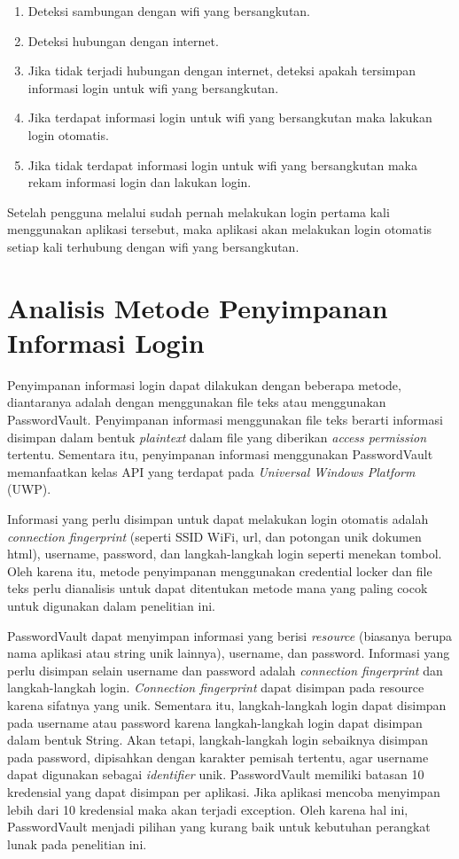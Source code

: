 \begin{enumerate}
    \item{Deteksi sambungan dengan wifi yang bersangkutan.}
    \item{Deteksi hubungan dengan internet.}
    \item{Jika tidak terjadi hubungan dengan internet, deteksi apakah tersimpan informasi login untuk wifi yang bersangkutan.}
    \item{Jika terdapat informasi login untuk wifi yang bersangkutan maka lakukan login otomatis.}
    \item{Jika tidak terdapat informasi login untuk wifi yang bersangkutan maka rekam informasi login dan lakukan login.}
\end{enumerate}

Setelah pengguna melalui sudah pernah melakukan login pertama kali menggunakan aplikasi tersebut, maka aplikasi akan melakukan login otomatis setiap kali terhubung dengan wifi yang bersangkutan.



\section{Analisis Metode Penyimpanan Informasi Login}
\label{sec:metode_penyimpanan}

Penyimpanan informasi login dapat dilakukan dengan beberapa metode, diantaranya adalah dengan menggunakan file teks atau menggunakan PasswordVault. Penyimpanan informasi menggunakan file teks berarti informasi disimpan dalam bentuk \textit{plaintext} dalam file yang diberikan \textit{access permission} tertentu. Sementara itu, penyimpanan informasi menggunakan PasswordVault memanfaatkan kelas API yang terdapat pada \textit{Universal Windows Platform} (UWP).

Informasi yang perlu disimpan untuk dapat melakukan login otomatis adalah \textit{connection fingerprint} (seperti SSID WiFi, url, dan potongan unik dokumen html), username, password, dan langkah-langkah login seperti menekan tombol. Oleh karena itu, metode penyimpanan menggunakan credential locker dan file teks perlu dianalisis untuk dapat ditentukan metode mana yang paling cocok untuk digunakan dalam penelitian ini.

PasswordVault dapat menyimpan informasi yang berisi \textit{resource} (biasanya berupa nama aplikasi atau string unik lainnya), username, dan password. Informasi yang perlu disimpan selain username dan password adalah \textit{connection fingerprint} dan langkah-langkah login. \textit{Connection fingerprint} dapat disimpan pada resource karena sifatnya yang unik. Sementara itu, langkah-langkah login dapat disimpan pada username atau password karena langkah-langkah login dapat disimpan dalam bentuk String. Akan tetapi, langkah-langkah login sebaiknya disimpan pada password, dipisahkan dengan karakter pemisah tertentu, agar username dapat digunakan sebagai \textit{identifier} unik. PasswordVault memiliki batasan 10 kredensial yang dapat disimpan per aplikasi. Jika aplikasi mencoba menyimpan lebih dari 10 kredensial maka akan terjadi exception. Oleh karena hal ini, PasswordVault menjadi pilihan yang kurang baik untuk kebutuhan perangkat lunak pada penelitian ini.

